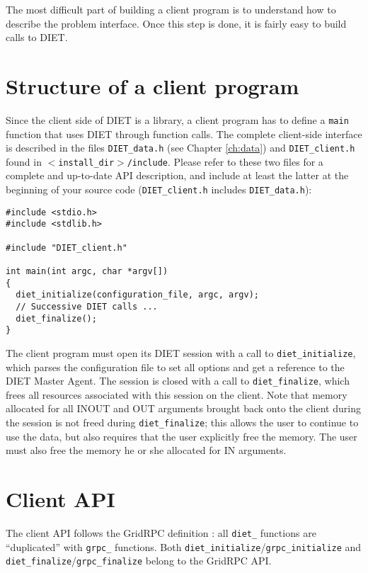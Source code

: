 The most difficult part of building a client program is to understand how
to describe the problem interface. Once this step is done, it is
fairly easy to build calls to DIET.

\section{Structure of a client program}
\label{sec:cl_struct}

Since the client side of DIET is a library, a client program has to define a
\texttt{main} function that uses DIET through function calls. The complete
client-side interface is described in the files
\texttt{DIET\_data.h} (see Chapter \ref{ch:data}) and
\texttt{DIET\_client.h} found in \texttt{$<$install\_dir$>$/include}.
Please refer to these two files for a complete and
up-to-date API description, and include at least the latter at the beginning of
your source code (\texttt{DIET\_client.h} includes \texttt{DIET\_data.h}):
{\footnotesize
\begin{verbatim}
#include <stdio.h>
#include <stdlib.h>

#include "DIET_client.h"

int main(int argc, char *argv[])
{
  diet_initialize(configuration_file, argc, argv);
  // Successive DIET calls ...
  diet_finalize();
}
\end{verbatim}
}

The client program must open its DIET session with a call to
\texttt{diet\_initialize}, which parses the configuration file to set
all options and get a reference to the DIET Master Agent. The session
is closed with a call to \texttt{diet\_finalize}, which frees all
resources associated with this session on the client. Note that
memory allocated for all INOUT and OUT arguments brought back onto
the client during the session is not freed during
\texttt{diet\_finalize}; this allows the user to continue to use the
data, but also requires that the user explicitly free the memory.
The user must also free the memory he or she allocated for IN
arguments.

\section{Client API}
\label{sec:clAPI}

The client API follows the GridRPC definition \cite{gridRPC:02}: all
\texttt{diet\_} functions are ``duplicated'' with \texttt{grpc\_}
functions.  Both \texttt{diet\_initialize}/\texttt{grpc\_initialize}
and \texttt{diet\_finalize}/\texttt{grpc\_finalize} belong to the
GridRPC API. 
 
